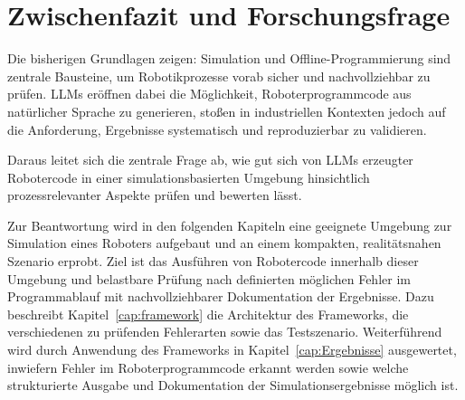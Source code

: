 \section{Zwischenfazit und Forschungsfrage}

Die bisherigen Grundlagen zeigen: Simulation und
Offline-Programmierung sind zentrale Bausteine, um Robotikprozesse
vorab sicher und nachvollziehbar zu prüfen. LLMs eröffnen dabei die
Möglichkeit, Roboterprogrammcode aus natürlicher Sprache zu generieren,
stoßen in industriellen Kontexten jedoch auf die Anforderung,
Ergebnisse systematisch und reproduzierbar zu validieren.

Daraus leitet sich die zentrale Frage ab, wie gut sich
von LLMs erzeugter Robotercode in einer simulationsbasierten
Umgebung hinsichtlich prozessrelevanter Aspekte
prüfen und bewerten lässt.

Zur Beantwortung wird in den folgenden Kapiteln eine geeignete
Umgebung zur Simulation eines Roboters aufgebaut und an einem
kompakten, realitätsnahen
Szenario erprobt. Ziel ist das Ausführen von Robotercode innerhalb dieser
Umgebung und belastbare Prüfung nach definierten möglichen Fehler im
Programmablauf mit nachvollziehbarer Dokumentation der Ergebnisse.
Dazu beschreibt Kapitel~\ref{cap:framework} die Architektur des
Frameworks, die verschiedenen zu prüfenden Fehlerarten sowie das
Testszenario. Weiterführend wird durch Anwendung des Frameworks in
Kapitel~\ref{cap:Ergebnisse} ausgewertet, inwiefern Fehler im
Roboterprogrammcode
erkannt werden sowie welche strukturierte Ausgabe und Dokumentation der
Simulationsergebnisse möglich ist.
